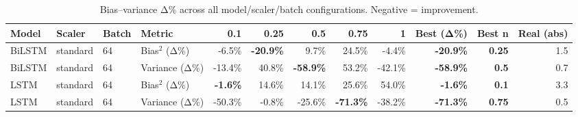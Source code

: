\renewcommand{\arraystretch}{1.2}
\begin{table}[!t]
\centering
\footnotesize
\caption{Bias–variance Δ\% across all model/scaler/batch configurations. Negative = improvement.}
\label{tab:bvdelta_all}
\setlength{\tabcolsep}{4pt}
\begin{tabular}{l l l l rrrrrrrr}
\toprule
Model & Scaler & Batch & Metric & 0.1 & 0.25 & 0.5 & 0.75 & 1 & Best (Δ\%) & Best n & Real (abs) \\
\midrule
BiLSTM & standard & 64 & Bias$^2$ (Δ\%) & -6.5\% & \textbf{-20.9\%} & 9.7\% & 24.5\% & -4.4\% & \textbf{-20.9\%} & \textbf{0.25} & 1.5 \\
BiLSTM & standard & 64 & Variance (Δ\%) & -13.4\% & 40.8\% & \textbf{-58.9\%} & 53.2\% & -42.1\% & \textbf{-58.9\%} & \textbf{0.5} & 0.7 \\
LSTM & standard & 64 & Bias$^2$ (Δ\%) & \textbf{-1.6\%} & 14.6\% & 14.1\% & 25.6\% & 54.0\% & \textbf{-1.6\%} & \textbf{0.1} & 3.3 \\
LSTM & standard & 64 & Variance (Δ\%) & -50.3\% & -0.8\% & -25.6\% & \textbf{-71.3\%} & -38.2\% & \textbf{-71.3\%} & \textbf{0.75} & 0.5 \\
\bottomrule
\end{tabular}

\end{table}

